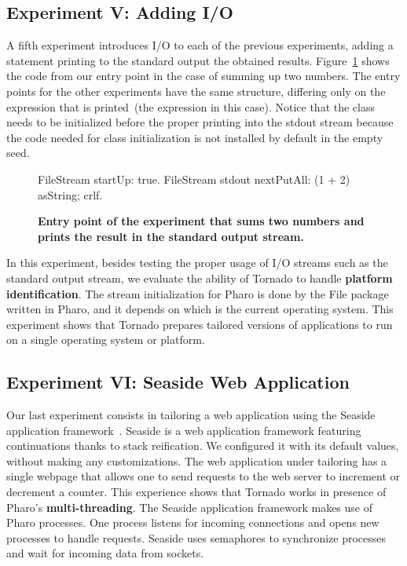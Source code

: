 \subsection*{Experiment V: Adding I/O} \label{sec:results_helloworld}

A fifth experiment introduces I/O to each of the previous experiments, adding a statement printing to the standard output the obtained results. Figure~\ref{fig:hello_world_entry_point} shows the code from our entry point in the case of summing up two numbers. The entry points for the other experiments have the same structure, differing only on the expression that is printed~(the  expression in this case). Notice that the  class needs to be initialized before the proper printing into the stdout stream because the code needed for class initialization is not installed by default in the empty seed.

\begin{figure}[ht]

\begin{code}
FileStream startUp: true.
FileStream stdout 
	nextPutAll: (1 + 2) asString;
	crlf.
\end{code}
\caption{ \textbf{Entry point of the experiment that sums two numbers and prints the result in the standard output stream.}\label{fig:hello_world_entry_point}}
\end{figure}

In this experiment, besides testing the proper usage of I/O streams such as the standard output stream, we evaluate the ability of Tornado to handle \textbf{platform identification}. The  stream initialization for Pharo is done by the File package written in Pharo, and it depends on which is the current operating system. This experiment shows that Tornado prepares tailored versions of applications to run on a single operating system or platform.

\subsection*{Experiment VI: Seaside Web Application}



Our last experiment consists in tailoring a web application using the Seaside application framework~\cite{Duca07a}. Seaside is a web application framework featuring continuations thanks to stack reification. We configured it with its default values, without making any customizations. The web application under tailoring has a single webpage that allows one to send requests to the web server to increment or decrement a counter. This experience shows that Tornado works in presence of Pharo's \textbf{multi-threading}. The Seaside application framework makes use of Pharo processes. One process listens for incoming connections and opens new processes to handle requests. Seaside uses semaphores to synchronize processes and wait for incoming data from sockets.

